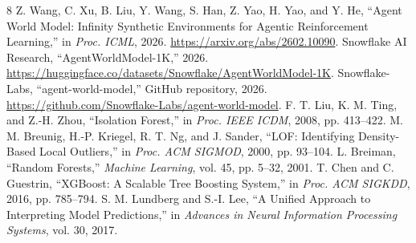 \documentclass[conference]{IEEEtran}
\begin{document}
\begin{thebibliography}{8}
 Z. Wang, C. Xu, B. Liu, Y. Wang, S. Han, Z. Yao, H. Yao, and Y. He, ``Agent World Model: Infinity Synthetic Environments for Agentic Reinforcement Learning,'' in \emph{Proc. ICML}, 2026. \url{https://arxiv.org/abs/2602.10090}.
 Snowflake AI Research, ``AgentWorldModel-1K,'' 2026. \url{https://huggingface.co/datasets/Snowflake/AgentWorldModel-1K}.
 Snowflake-Labs, ``agent-world-model,'' GitHub repository, 2026. \url{https://github.com/Snowflake-Labs/agent-world-model}.
 F. T. Liu, K. M. Ting, and Z.-H. Zhou, ``Isolation Forest,'' in \emph{Proc. IEEE ICDM}, 2008, pp. 413--422.
 M. M. Breunig, H.-P. Kriegel, R. T. Ng, and J. Sander, ``LOF: Identifying Density-Based Local Outliers,'' in \emph{Proc. ACM SIGMOD}, 2000, pp. 93--104.
 L. Breiman, ``Random Forests,'' \emph{Machine Learning}, vol. 45, pp. 5--32, 2001.
 T. Chen and C. Guestrin, ``XGBoost: A Scalable Tree Boosting System,'' in \emph{Proc. ACM SIGKDD}, 2016, pp. 785--794.
 S. M. Lundberg and S.-I. Lee, ``A Unified Approach to Interpreting Model Predictions,'' in \emph{Advances in Neural Information Processing Systems}, vol. 30, 2017.
\end{thebibliography}
\end{document}
